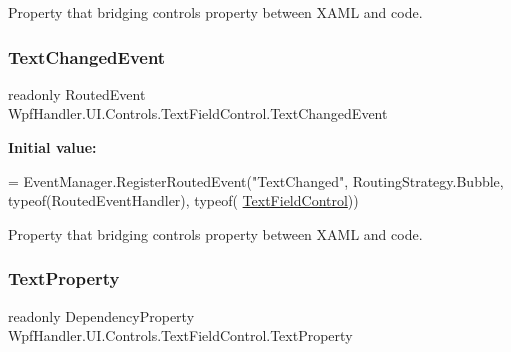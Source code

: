 Property that bridging control\textquotesingle{}s property between X\+A\+ML and code. 

\mbox{\label{class_wpf_handler_1_1_u_i_1_1_controls_1_1_text_field_control_af4ec0cb3db2339845ead75a90d0f18ff}} 
\subsubsection{\texorpdfstring{Text\+Changed\+Event}{TextChangedEvent}}
{\footnotesize\ttfamily readonly Routed\+Event Wpf\+Handler.\+U\+I.\+Controls.\+Text\+Field\+Control.\+Text\+Changed\+Event\hspace{0.3cm}{\ttfamily [static]}}

{\bfseries Initial value\+:}
\begin{DoxyCode}
= EventManager.RegisterRoutedEvent(\textcolor{stringliteral}{"TextChanged"},
            RoutingStrategy.Bubble, typeof(RoutedEventHandler), typeof(
      \mbox{\hyperlink{class_wpf_handler_1_1_u_i_1_1_controls_1_1_text_field_control_a90ff02e9ee1b2b63d034a3376594ddf4}{TextFieldControl}}))
\end{DoxyCode}


Property that bridging control\textquotesingle{}s property between X\+A\+ML and code. 

\mbox{\label{class_wpf_handler_1_1_u_i_1_1_controls_1_1_text_field_control_a333e66e23a4653713e1a4b27571b7553}} 
\subsubsection{\texorpdfstring{Text\+Property}{TextProperty}}
{\footnotesize\ttfamily readonly Dependency\+Property Wpf\+Handler.\+U\+I.\+Controls.\+Text\+Field\+Control.\+Text\+Property\hspace{0.3cm}{\ttfamily [static]}}

